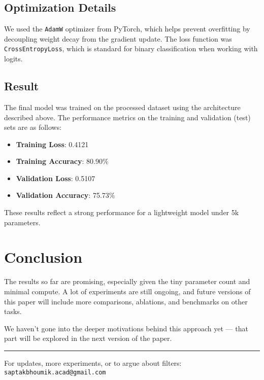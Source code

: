 \documentclass{article}
\begin{document}
\subsection*{Optimization Details}

We used the \texttt{AdamW} optimizer from PyTorch, which helps prevent overfitting by decoupling weight decay from the gradient update. The loss function was \texttt{CrossEntropyLoss}, which is standard for binary classification when working with logits.


\subsection*{Result}

The final model was trained on the processed dataset using the architecture described above. The performance metrics on the training and validation (test) sets are as follows:

\begin{itemize}
  \item \textbf{Training Loss}: 0.4121
  \item \textbf{Training Accuracy}: 80.90\%
  \item \textbf{Validation Loss}: 0.5107
  \item \textbf{Validation Accuracy}: 75.73\%
\end{itemize}

These results reflect a strong performance for a lightweight model under 5k parameters.

\section*{Conclusion}

The results so far are promising, especially given the tiny parameter count and minimal compute. A lot of experiments are still ongoing, and future versions of this paper will include more comparisons, ablations, and benchmarks on other tasks.

We haven’t gone into the deeper motivations behind this approach yet — that part will be explored in the next version of the paper.

\vspace{1em}
\noindent\rule{\textwidth}{0.4pt}
\vspace{0.5em}

\noindent For updates, more experiments, or to argue about filters: \texttt{saptakbhoumik.acad@gmail.com}
\end{document}
